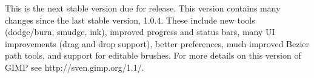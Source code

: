 This is the next stable version due for release.  This version contains many
changes since the last stable version, 1.0.4. These include new tools\\
(dodge/burn, smudge, ink), improved progress and status bars, many UI 
improvements (drag and drop support), better preferences, much improved Bezier
path tools, and support for editable brushes. For more details on this version
of GIMP see http://sven.gimp.org/1.1/.
